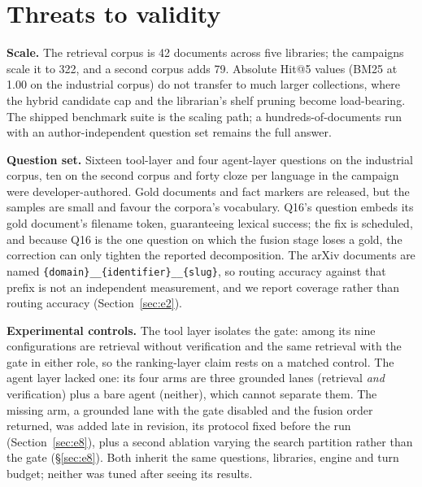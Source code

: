 \section{Threats to validity}
\label{sec:threats}

\noindent\textbf{Scale.} The retrieval corpus is 42 documents across five
libraries; the campaigns scale it to 322, and a second corpus adds 79. Absolute
Hit@5 values (BM25 at 1.00 on the industrial corpus) do not transfer to much
larger collections, where the hybrid candidate cap and the librarian's shelf
pruning become load-bearing. The shipped benchmark suite is the scaling path; a
hundreds-of-documents run with an author-independent question set remains the
full answer.

\noindent\textbf{Question set.} Sixteen tool-layer and four agent-layer
questions on the industrial corpus, ten on the second corpus and forty cloze per
language in the campaign were developer-authored. Gold documents and fact
markers are released, but the samples are small and favour the corpora's
vocabulary. Q16's question embeds its gold document's filename token,
guaranteeing lexical success; the fix is scheduled, and because Q16 is the one
question on which the fusion stage loses a gold, the correction can only tighten
the reported decomposition. The arXiv documents are named
\texttt{\{domain\}\_\_\{identifier\}\_\_\{slug\}}, so routing accuracy against
that prefix is not an independent measurement, and we report coverage rather
than routing accuracy (Section~\ref{sec:e2}).

\noindent\textbf{Experimental controls.} The tool layer isolates the gate:
among its nine configurations are retrieval without verification and the same
retrieval with the gate in either role, so the ranking-layer claim rests on a
matched control. The agent layer lacked one: its four arms are three grounded
lanes (retrieval \emph{and} verification) plus a bare agent (neither), which
cannot separate them. The missing arm, a grounded lane with the gate disabled
and the fusion order returned, was added late in revision, its protocol fixed
before the run (Section~\ref{sec:e8}), plus a second ablation varying
the search partition rather than the gate (\S\ref{sec:e8}). Both inherit
the same questions, libraries, engine and turn budget; neither was tuned after
seeing its results.

